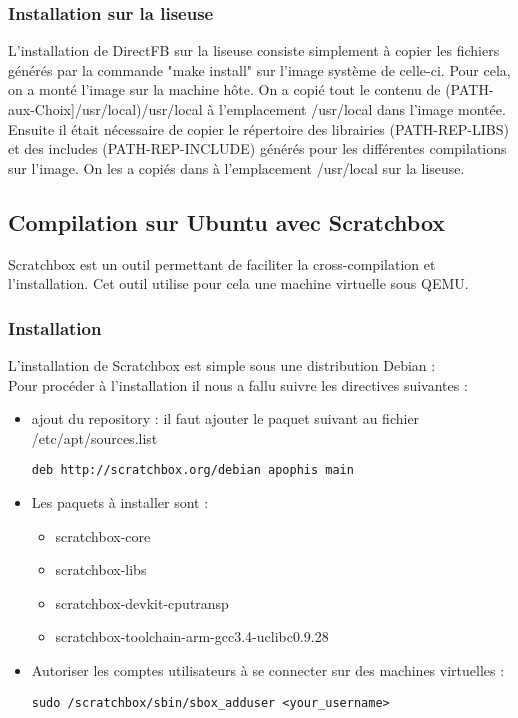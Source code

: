 \subsubsection{Installation sur la liseuse}


L'installation de DirectFB sur la liseuse consiste simplement à copier les fichiers générés par la commande "make install" sur l'image système de celle-ci. Pour cela, on a monté l'image sur la machine hôte. On a copié tout le contenu de (PATH-aux-Choix]/usr/local)/usr/local à l'emplacement /usr/local dans l'image montée. Ensuite il était nécessaire de copier le répertoire des librairies (PATH-REP-LIBS) et des includes (PATH-REP-INCLUDE) générés pour les différentes compilations sur l'image. On les a copiés dans à l'emplacement /usr/local sur la liseuse. 

\newpage

\subsection{Compilation sur Ubuntu avec Scratchbox}

Scratchbox est un outil permettant de faciliter la cross-compilation et l'installation. Cet outil utilise pour cela une machine virtuelle sous QEMU.

\subsubsection{Installation}

L'installation de Scratchbox est simple sous une distribution Debian : \\
Pour procéder à l'installation il nous a fallu suivre les directives suivantes :
\begin{itemize}
	\item ajout du repository :
		il faut ajouter le paquet suivant au fichier /etc/apt/sources.list
		\begin{lstlisting}
deb http://scratchbox.org/debian apophis main
		\end{lstlisting}
	\item 
		Les paquets à installer sont :
			\begin{itemize}
				\item scratchbox-core
				\item scratchbox-libs
				\item scratchbox-devkit-cputransp
				\item scratchbox-toolchain-arm-gcc3.4-uclibc0.9.28
			\end{itemize}
	\item Autoriser les comptes utilisateurs à se connecter sur des machines virtuelles : 
	\begin{lstlisting}
sudo /scratchbox/sbin/sbox_adduser <your_username>
	\end{lstlisting}	
\end{itemize}

